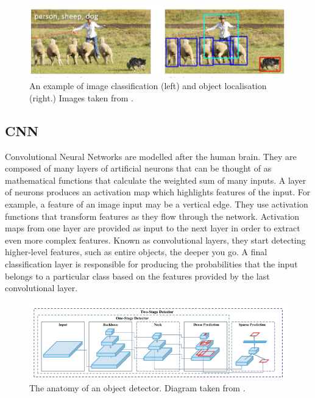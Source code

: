 \documentclass{thesis}
\begin{document}
\begin{figure}[h]
    \centering
    \includegraphics[scale=1]{images/person-sheep-dog.PNG}
    \caption{An example of image classification (left) and object localisation (right.) Images taken from \cite{lin2015microsoft}.}
    \label{fig:cnn-diagram}
\end{figure}

\subsection{CNN}

Convolutional Neural Networks are modelled after the human brain. They are composed of many layers of artificial neurons that can be thought of as mathematical functions that calculate the weighted sum of many inputs. A layer of neurons produces an activation map which highlights features of the input. For example, a feature of an image input may be a vertical edge. They use activation functions that transform features as they flow through the network. Activation maps from one layer are provided as input to the next layer in order to extract even more complex features. Known as convolutional layers, they start detecting higher-level features, such as entire objects, the deeper you go. A final classification layer is responsible for producing the probabilities that the input belongs to a particular class based on the features provided by the last convolutional layer.

\begin{figure}[h]
    \centering
    \includegraphics[scale=0.6]{images/cnn-diagram.png}
    \caption{The anatomy of an object detector. Diagram taken from \cite{yolov4}.}
    \label{fig:cnn-diagram}
\end{figure}
\end{document}
